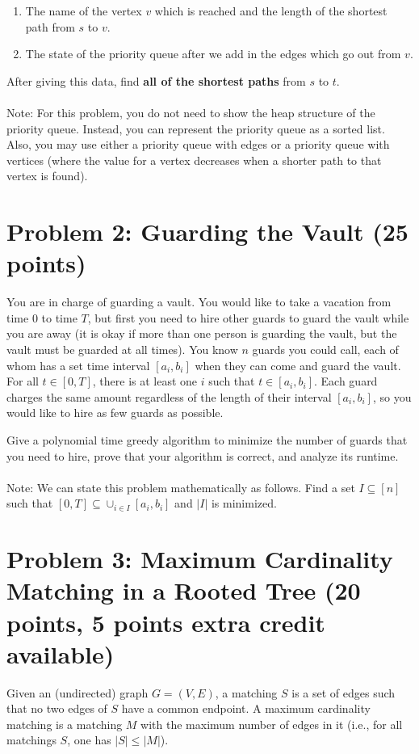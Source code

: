 \documentclass[12pt]{article}
\begin{document}
\begin{enumerate}
\item The name of the vertex $v$ which is reached and the length of the shortest path from $s$ to $v$.
\item The state of the priority queue after we add in the edges which go out from $v$.
\end{enumerate}
After giving this data, find {\bf all of the shortest paths} from $s$ to $t$.\\
\\
Note: For this problem, you do not need to show the heap structure of the priority queue. Instead, you can represent the priority queue as a sorted list. Also, you may use either a priority queue with edges or a priority queue with vertices (where the value for a vertex decreases when a shorter path to that vertex is found).
\section*{Problem 2: Guarding the Vault (25 points)}
You are in charge of guarding a vault. You would like to take a vacation from time $0$ to time $T$, but first you need to hire other guards to guard the vault while you are away (it is okay if more than one person is guarding the vault, but the vault must be guarded at all times). You know $n$ guards you could call, each of whom has a set time interval $[a_i,b_i]$ when they can come and guard the vault. For all $t \in [0,T]$, there is at least one $i$ such that $t \in [a_i,b_i]$. Each guard charges the same amount regardless of the length of their interval $[a_i,b_i]$, so you would like to hire as few guards as possible.

Give a polynomial time greedy algorithm to minimize the number of guards that you need to hire, prove that your algorithm is correct, and analyze its runtime.\\
\\
Note: We can state this problem mathematically as follows. Find a set $I \subseteq [n]$ such that $[0,T] \subseteq \cup_{i \in I}{[a_i,b_i]}$ and $|I|$ is minimized.

\vspace{5mm}
\section*{Problem 3: Maximum Cardinality Matching in a Rooted Tree (20 points, 5 points extra credit available)}

Given an (undirected) graph $G=(V,E)$, a matching $S$ is a set of edges such that no two edges of $S$ have a common endpoint. A maximum cardinality matching is a matching $M$ with the maximum number of edges in it (i.e., for all matchings $S$, one has $|S| \leq |M|$).
\end{document}
